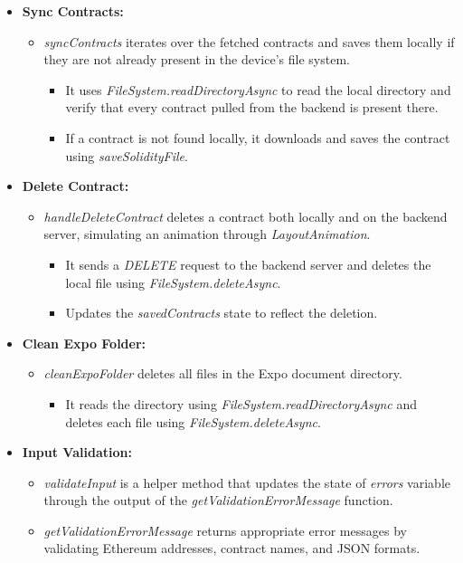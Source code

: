 \begin{itemize}
    \item \textbf{Sync Contracts:}
    \begin{itemize}
        \item \textit{syncContracts} iterates over the fetched contracts and saves them locally if they are not already present in the device's file system.
        \begin{itemize}
            \item It uses \textit{FileSystem.readDirectoryAsync} to read the local directory and verify that every contract pulled from the backend is present there.
            \item If a contract is not found locally, it downloads and saves the contract using \textit{saveSolidityFile}.
        \end{itemize}
    \end{itemize}

    \item \textbf{Delete Contract:}
    \begin{itemize}
        \item \textit{handleDeleteContract} deletes a contract both locally and on the backend server, simulating an animation through \textit{LayoutAnimation}.
        \begin{itemize}
            \item It sends a \textit{DELETE} request to the backend server and deletes the local file using \textit{FileSystem.deleteAsync}.
            \item Updates the \textit{savedContracts} state to reflect the deletion.
        \end{itemize}
    \end{itemize}

    \item \textbf{Clean Expo Folder:}
    \begin{itemize}
        \item \textit{cleanExpoFolder} deletes all files in the Expo document directory.
        \begin{itemize}
            \item It reads the directory using \textit{FileSystem.readDirectoryAsync} and deletes each file using \textit{FileSystem.deleteAsync}.
        \end{itemize}
    \end{itemize}

    \item \textbf{Input Validation:}
    \begin{itemize}
        \item \textit{validateInput} is a helper method that updates the state of \textit{errors} variable through the output of the \textit{getValidationErrorMessage} function.
        \item \textit{getValidationErrorMessage} returns appropriate error messages by validating Ethereum addresses, contract names, and JSON formats.
    \end{itemize}


\end{itemize}
